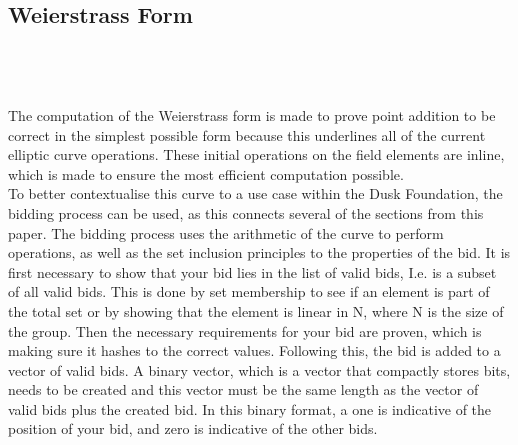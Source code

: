 \documentclass{article}
\begin{document}
\subsection{Weierstrass Form}
\noindent{}\\\\\\
The computation of the Weierstrass form is made to prove point addition to be correct in the simplest possible form because this underlines all of the current elliptic curve operations. These initial operations on the field elements are inline, which is made to ensure the most efficient computation possible.\\

To better contextualise this curve to a use case within the Dusk Foundation, the bidding process can be used, as this connects several of the sections from this paper. The bidding process uses the arithmetic of the curve to perform operations, as well as the set inclusion principles to the properties of the bid. It is first necessary to show that your bid lies in the list of valid bids, I.e. is a subset of all valid bids. This is done by set membership to see if an element is part of the total set or by showing that the element is linear in N, where N is the size of the group. Then the necessary requirements for your bid are proven, which is making sure it hashes to the correct values. Following this, the bid is added to a vector of valid bids. A binary vector, which is a vector that compactly stores bits, needs to be created and this vector must be the same length as the vector of valid bids plus the created bid. In this binary format, a one is indicative of the position of your bid, and zero is indicative of the other bids.
\end{document}
